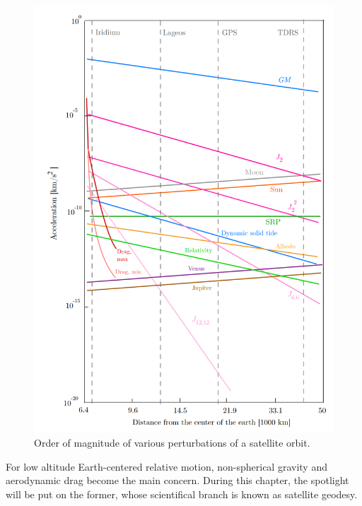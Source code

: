 	\begin{figure}[!htb]
	\begin{changemargin}{-1.2cm}{0cm}
	\centering\includegraphics[width = 0.95\linewidth]{Chapters/Chapter_04/Pert_montenbruck}
	\end{changemargin}
	\caption{Order of magnitude of various perturbations of a satellite orbit. \cite{Montenbruck}}
	\label{figCh4:Pert_montenbruck}
	\end{figure}
	\FloatBarrier
	\indent For low altitude Earth-centered relative motion, non-spherical gravity and aerodynamic drag become the main concern. During this chapter, the spotlight will be put on the former, whose scientifical branch is known as satellite geodesy.
